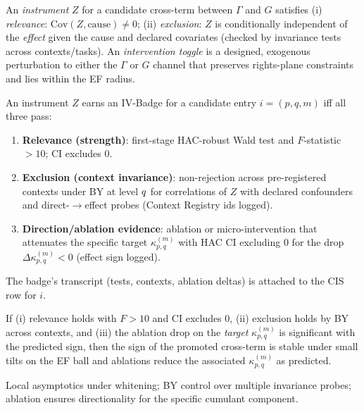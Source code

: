 \begin{definition}\label{def:inst-int}
\emph{}
An \emph{instrument} $Z$ for a candidate cross-term between $\Gamma$ and $G$ satisfies (i) \emph{relevance}:
$\mathrm{Cov}(Z,\text{cause})\neq 0$; (ii) \emph{exclusion}: $Z$ is conditionally independent of the \emph{effect} given the cause and declared covariates (checked by invariance tests across contexts/tasks).
An \emph{intervention toggle} is a designed, exogenous perturbation to either the $\Gamma$ or $G$ channel that preserves rights-plane constraints and lies within the EF radius.
\end{definition}

\begin{definition}\label{def:iv-badge}
\emph{}
An instrument $Z$ earns an \textsf{IV-Badge} for a candidate entry $i\!=\!(p,q,m)$ iff all three pass:
\begin{enumerate}[leftmargin=*,itemsep=2pt]
\item \textbf{Relevance (strength)}: first-stage HAC-robust Wald test and $F$-statistic $>10$; CI excludes $0$.
\item \textbf{Exclusion (context invariance)}: non-rejection across pre-registered contexts under BY at level $q$ for correlations of $Z$ with declared confounders and direct-$\to$effect probes (Context Registry ids logged).
\item \textbf{Direction/ablation evidence}: ablation or micro-intervention that attenuates the specific target $\kappa_{p,q}^{(m)}$ with HAC CI excluding $0$ for the drop $\Delta\kappa_{p,q}^{(m)}<0$ (effect sign logged).
\end{enumerate}
The badge’s transcript (tests, contexts, ablation deltas) is attached to the CIS row for $i$.
\end{definition}

\begin{lemma}\label{lem:inst-tests}
\emph{}
If (i) relevance holds with $F>10$ and CI excludes $0$, (ii) exclusion holds by BY across contexts, and (iii) the ablation drop on the \emph{target} $\kappa_{p,q}^{(m)}$ is significant with the predicted sign, then the sign of the promoted cross-term is stable under small tilts on the EF ball and ablations reduce the associated $\kappa_{p,q}^{(m)}$ as predicted.
\begin{proofsketch}
Local asymptotics under whitening; BY control over multiple invariance probes; ablation ensures directionality for the specific cumulant component.
\end{proofsketch}
\end{lemma}


